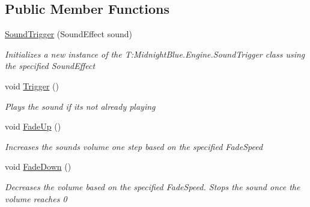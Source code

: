 \subsection*{Public Member Functions}
\begin{DoxyCompactItemize}
\item 
\hyperlink{class_midnight_blue_1_1_engine_1_1_sound_trigger_add2bdff21e821e0cd29471ae5b2f6552}{Sound\+Trigger} (Sound\+Effect sound)
\begin{DoxyCompactList}\small\item\em Initializes a new instance of the T\+:\+Midnight\+Blue.\+Engine.\+Sound\+Trigger class using the specified Sound\+Effect \end{DoxyCompactList}\item 
void \hyperlink{class_midnight_blue_1_1_engine_1_1_sound_trigger_a778de9a57b0567bab1d0c97c9084f1d0}{Trigger} ()
\begin{DoxyCompactList}\small\item\em Plays the sound if it\textquotesingle{}s not already playing \end{DoxyCompactList}\item 
void \hyperlink{class_midnight_blue_1_1_engine_1_1_sound_trigger_a97b79ca1906cdb3138da1f120d4c64fd}{Fade\+Up} ()
\begin{DoxyCompactList}\small\item\em Increases the sounds volume one step based on the specified Fade\+Speed \end{DoxyCompactList}\item 
void \hyperlink{class_midnight_blue_1_1_engine_1_1_sound_trigger_ac3df1f278adce8dac56f94cc9de8eaca}{Fade\+Down} ()
\begin{DoxyCompactList}\small\item\em Decreases the volume based on the specified Fade\+Speed. Stops the sound once the volume reaches 0 \end{DoxyCompactList}\end{DoxyCompactItemize}
